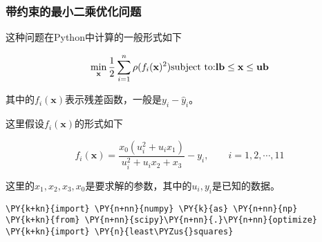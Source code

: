     \hypertarget{ux5e26ux7ea6ux675fux7684ux6700ux5c0fux4e8cux4e58ux4f18ux5316ux95eeux9898}{%
\subsubsection{带约束的最小二乘优化问题}\label{ux5e26ux7ea6ux675fux7684ux6700ux5c0fux4e8cux4e58ux4f18ux5316ux95eeux9898}}

    这种问题在Python中计算的一般形式如下

    \[
\min\limits_{\textbf{x}}\dfrac{1}{2}\sum^n_{i=1}\rho(f_i(\textbf{x})^2)\\
\text{subject to:}\\
\textbf{lb}\le \textbf{x}\le \textbf{ub}
\]

    其中的\(f_i(\textbf{x})\)表示残差函数，一般是\(y_i-\hat{y}_i\)。

    这里假设\(f_i(\textbf{x})\)的形式如下

\[
f_i(\textbf{x})=\dfrac{x_0(u^2_i+u_ix_1)}{u^2_i+u_ix_2+x_3}-y_i,\quad\quad i=1,2,\cdots,11
\]

    这里的\(x_1,x_2,x_3,x_0\)是要求解的参数，其中的\(u_i,y_i\)是已知的数据。

    \begin{tcolorbox}[breakable, size=fbox, boxrule=1pt, pad at break*=1mm,colback=cellbackground, colframe=cellborder]
\begin{Verbatim}[commandchars=\\\{\}]
\PY{k+kn}{import} \PY{n+nn}{numpy} \PY{k}{as} \PY{n+nn}{np}
\PY{k+kn}{from} \PY{n+nn}{scipy}\PY{n+nn}{.}\PY{n+nn}{optimize} \PY{k+kn}{import} \PY{n}{least\PYZus{}squares}
\end{Verbatim}
\end{tcolorbox}

